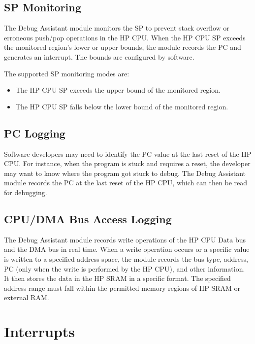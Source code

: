 \documentclass[main\_\_EN.tex]{subfiles}
\begin{document}
\subsection{SP Monitoring}

The Debug Assistant module monitors the SP to prevent stack overflow or erroneous push/pop operations in the HP CPU. When the HP CPU SP exceeds the monitored region's lower or upper bounds, the module records the PC and generates an interrupt. The bounds are configured by software. 

The supported SP monitoring modes are:

\begin{itemize}
    \item The HP CPU SP exceeds the upper bound of the monitored region.
    \item The HP CPU SP falls below the lower bound of the monitored region.
\end{itemize}

\subsection{PC Logging}

Software developers may need to identify the PC value at the last reset of the HP CPU. For instance, when the program is stuck and requires a reset, the developer may want to know where the program got stuck to debug. The Debug Assistant module records the PC at the last reset of the HP CPU, which can then be read for debugging.

\subsection{CPU/DMA Bus Access Logging}

The Debug Assistant module records write operations of the HP CPU Data bus and the DMA bus in real time. When a write operation occurs or a specific value is written to a specified address space, the module records the bus type, address, PC (only when the write is performed by the HP CPU), and other information. It then stores the data in the HP SRAM in a specific format. The specified address range must fall within the permitted memory regions of HP SRAM or external RAM.


\section{Interrupts}
\label{sec:dbgassist-interrupts}
\end{document}

